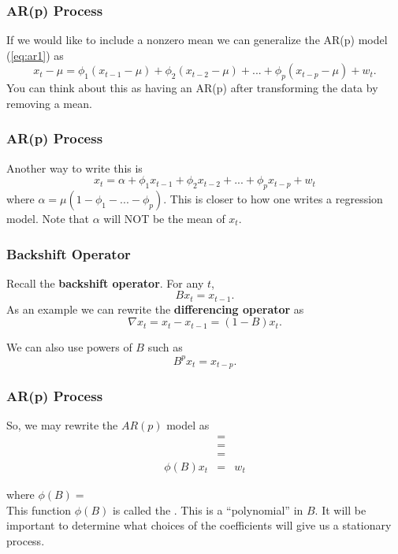 \documentclass[%
xcolor=pdftex]{beamer}
\begin{document}
\begin{frame}
\frametitle{AR(p) Process}

If we would like to include a nonzero mean we can generalize the AR(p) model (\ref{eq:ar1}) as
$$
x_t-\mu =\phi_1 (x_{t-1}-\mu)+ \phi_2 (x_{t-2}-\mu)+...+  \phi_p (x_{t-p}-\mu) + w_t.
$$
You can think about this as having an AR(p) after transforming the data by removing a mean.

\end{frame}

\begin{frame}
\frametitle{AR(p) Process}

Another way to write this is
$$
x_t=\alpha+\phi_1 x_{t-1} + \phi_2 x_{t-2} +...+  \phi_p x_{t-p} + w_t
$$
where $\alpha=\mu(1-\phi_1-...-\phi_p)$.  This is closer to how one writes a regression model.  Note that $\alpha$ will NOT be the mean of $x_t$.

\end{frame}


\begin{frame}
\frametitle{Backshift Operator}

Recall the \textbf{backshift operator}.  For any $t$,
$$
B x_t =x_{t-1}.
$$
As an example we can rewrite the \textbf{differencing operator} as
$$
\nabla x_t =x_t-x_{t-1}=(1-B)x_{t}.
$$

We can also use powers of $B$ such as
$$
B^p x_t = x_{t-p}.
$$

\end{frame}

\begin{frame}
\frametitle{AR(p) Process}

So, we may rewrite the $AR(p)$ model as
\begin{eqnarray} \label{eq:ar_op}
 & =&  \nonumber \\
 & =&  \nonumber \\
 & =&     \nonumber \\
\phi(B) x_t & =&    w_t
\end{eqnarray}

where $\phi(B)=$ \\
\vspace{5mm}
This function $\phi(B)$ is called the \underline{\hspace{40 mm}}.  This is a ``polynomial'' in $B$.  It will be important to determine what choices of the coefficients will give us a stationary process.

\end{frame}
\end{document}

